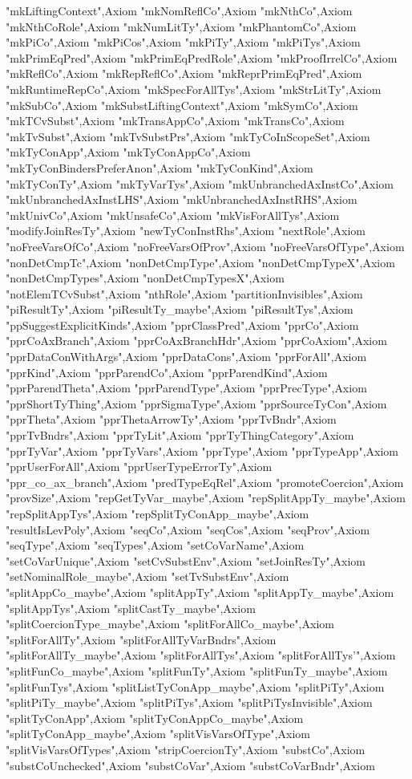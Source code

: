 {"mkLiftingContext"},{Axiom "mkNomReflCo"},{Axiom "mkNthCo"},{Axiom "mkNthCoRole"},{Axiom "mkNumLitTy"},{Axiom "mkPhantomCo"},{Axiom "mkPiCo"},{Axiom "mkPiCos"},{Axiom "mkPiTy"},{Axiom "mkPiTys"},{Axiom "mkPrimEqPred"},{Axiom "mkPrimEqPredRole"},{Axiom "mkProofIrrelCo"},{Axiom "mkReflCo"},{Axiom "mkRepReflCo"},{Axiom "mkReprPrimEqPred"},{Axiom "mkRuntimeRepCo"},{Axiom "mkSpecForAllTys"},{Axiom "mkStrLitTy"},{Axiom "mkSubCo"},{Axiom "mkSubstLiftingContext"},{Axiom "mkSymCo"},{Axiom "mkTCvSubst"},{Axiom "mkTransAppCo"},{Axiom "mkTransCo"},{Axiom "mkTvSubst"},{Axiom "mkTvSubstPrs"},{Axiom "mkTyCoInScopeSet"},{Axiom "mkTyConApp"},{Axiom "mkTyConAppCo"},{Axiom "mkTyConBindersPreferAnon"},{Axiom "mkTyConKind"},{Axiom "mkTyConTy"},{Axiom "mkTyVarTys"},{Axiom "mkUnbranchedAxInstCo"},{Axiom "mkUnbranchedAxInstLHS"},{Axiom "mkUnbranchedAxInstRHS"},{Axiom "mkUnivCo"},{Axiom "mkUnsafeCo"},{Axiom "mkVisForAllTys"},{Axiom "modifyJoinResTy"},{Axiom "newTyConInstRhs"},{Axiom "nextRole"},{Axiom "noFreeVarsOfCo"},{Axiom "noFreeVarsOfProv"},{Axiom "noFreeVarsOfType"},{Axiom "nonDetCmpTc"},{Axiom "nonDetCmpType"},{Axiom "nonDetCmpTypeX"},{Axiom "nonDetCmpTypes"},{Axiom "nonDetCmpTypesX"},{Axiom "notElemTCvSubst"},{Axiom "nthRole"},{Axiom "partitionInvisibles"},{Axiom "piResultTy"},{Axiom "piResultTy_maybe"},{Axiom "piResultTys"},{Axiom "ppSuggestExplicitKinds"},{Axiom "pprClassPred"},{Axiom "pprCo"},{Axiom "pprCoAxBranch"},{Axiom "pprCoAxBranchHdr"},{Axiom "pprCoAxiom"},{Axiom "pprDataConWithArgs"},{Axiom "pprDataCons"},{Axiom "pprForAll"},{Axiom "pprKind"},{Axiom "pprParendCo"},{Axiom "pprParendKind"},{Axiom "pprParendTheta"},{Axiom "pprParendType"},{Axiom "pprPrecType"},{Axiom "pprShortTyThing"},{Axiom "pprSigmaType"},{Axiom "pprSourceTyCon"},{Axiom "pprTheta"},{Axiom "pprThetaArrowTy"},{Axiom "pprTvBndr"},{Axiom "pprTvBndrs"},{Axiom "pprTyLit"},{Axiom "pprTyThingCategory"},{Axiom "pprTyVar"},{Axiom "pprTyVars"},{Axiom "pprType"},{Axiom "pprTypeApp"},{Axiom "pprUserForAll"},{Axiom "pprUserTypeErrorTy"},{Axiom "ppr_co_ax_branch"},{Axiom "predTypeEqRel"},{Axiom "promoteCoercion"},{Axiom "provSize"},{Axiom "repGetTyVar_maybe"},{Axiom "repSplitAppTy_maybe"},{Axiom "repSplitAppTys"},{Axiom "repSplitTyConApp_maybe"},{Axiom "resultIsLevPoly"},{Axiom "seqCo"},{Axiom "seqCos"},{Axiom "seqProv"},{Axiom "seqType"},{Axiom "seqTypes"},{Axiom "setCoVarName"},{Axiom "setCoVarUnique"},{Axiom "setCvSubstEnv"},{Axiom "setJoinResTy"},{Axiom "setNominalRole_maybe"},{Axiom "setTvSubstEnv"},{Axiom "splitAppCo_maybe"},{Axiom "splitAppTy"},{Axiom "splitAppTy_maybe"},{Axiom "splitAppTys"},{Axiom "splitCastTy_maybe"},{Axiom "splitCoercionType_maybe"},{Axiom "splitForAllCo_maybe"},{Axiom "splitForAllTy"},{Axiom "splitForAllTyVarBndrs"},{Axiom "splitForAllTy_maybe"},{Axiom "splitForAllTys"},{Axiom "splitForAllTys'"},{Axiom "splitFunCo_maybe"},{Axiom "splitFunTy"},{Axiom "splitFunTy_maybe"},{Axiom "splitFunTys"},{Axiom "splitListTyConApp_maybe"},{Axiom "splitPiTy"},{Axiom "splitPiTy_maybe"},{Axiom "splitPiTys"},{Axiom "splitPiTysInvisible"},{Axiom "splitTyConApp"},{Axiom "splitTyConAppCo_maybe"},{Axiom "splitTyConApp_maybe"},{Axiom "splitVisVarsOfType"},{Axiom "splitVisVarsOfTypes"},{Axiom "stripCoercionTy"},{Axiom "substCo"},{Axiom "substCoUnchecked"},{Axiom "substCoVar"},{Axiom "substCoVarBndr"},{Axiom }
